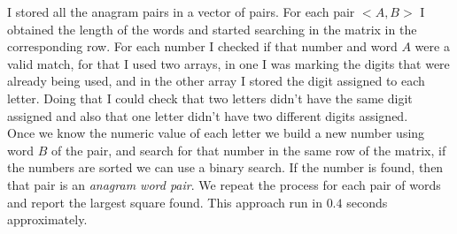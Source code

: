 I stored all the anagram pairs in a vector of pairs. For each pair $<A,B>$ I obtained the length of the words and started searching in the matrix in the corresponding row. For each number I checked  if that number and word $A$ were a valid match, for that I used two arrays, in one I was marking the digits that were already being used, and in the other array I stored the digit assigned to each letter. Doing that I could check that two letters didn't have the same digit assigned and also that one letter didn't have two different digits assigned.\\

Once we know the numeric value of each letter we build a new number using word $B$ of the pair, and search for that number in the same row of the matrix, if the numbers are sorted we can use a binary search. If the number is found, then that pair is an \textit{anagram word pair}. We repeat the process for each pair of words and report the largest square found. This approach run in $0.4$ seconds approximately. 